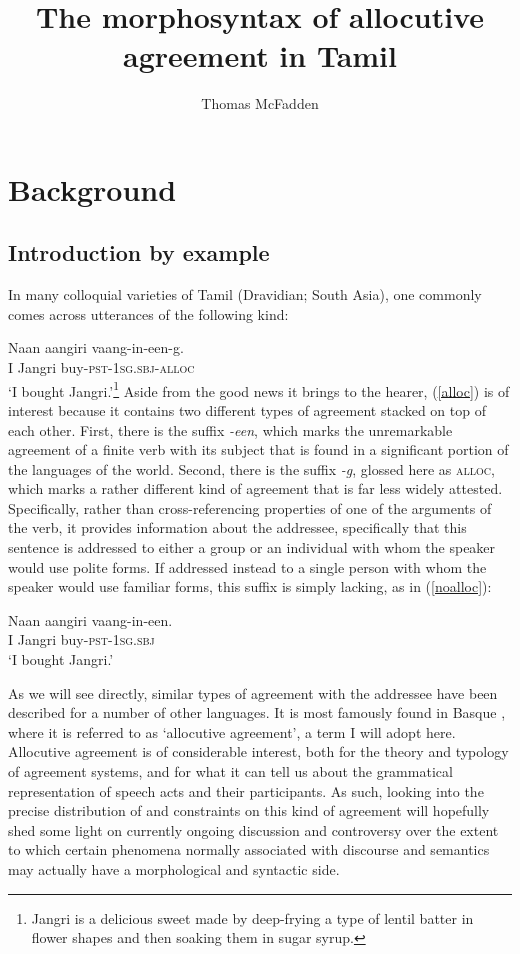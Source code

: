 \documentclass[output=paper, modfonts, nonflat]{langsci/langscibook}
\title{The morphosyntax of allocutive agreement in Tamil}
\author{%
  Thomas McFadden\affiliation{Leibniz-Zentrum Allgemeine Sprachwissenschaft}
}
\begin{document}
\maketitle


\section{Background}

\subsection{Introduction by example}

In many colloquial varieties of Tamil (Dravidian; South Asia), one
commonly comes across utterances of the following kind:

\ea\label{alloc}
\gll Naan \J aangiri vaang-in-een-\ng g\A.\\
I Jangri buy-\textsc{pst}{}-1\textsc{sg.sbj}-\textsc{alloc}\\
\glt `I bought Jangri.'\footnote{Jangri is a delicious sweet made by
  deep-frying a type of lentil batter in flower shapes and then
  soaking them in sugar syrup.} 
\z 
%
Aside from the good news it brings to the hearer, (\ref{alloc}) is of
interest because it contains two different types of agreement stacked
on top of each other. First, there is the suffix \textit{-een}, which
marks the unremarkable agreement of a finite verb with its subject
that is found in a significant portion of the languages of the
world. Second, there is the suffix \textit{-\ng g\A}, glossed here as
\textsc{alloc}, which marks a rather different kind of agreement that
is far less widely attested. Specifically, rather than
cross-referencing properties of one of the arguments of the verb, it
provides information about the addressee, specifically that this
sentence is addressed to either a group or an individual with whom the
speaker would use polite forms. If addressed instead to a single
person with whom the speaker would use familiar forms, this suffix is
simply lacking, as in (\ref{noalloc}):

\ea\label{noalloc}
\gll Naan \J aangiri vaang-in-een.\\
I Jangri buy-\textsc{pst}{}-1\textsc{sg.sbj}\\
\glt `I bought Jangri.'
\z 

\noindent As we will see directly, similar types of agreement with the addressee
have been described for a number of other languages. It is most
famously found in Basque \citep{oyharcabal:1993}, where it is referred
to as `allocutive agreement', a term I will adopt here. Allocutive
agreement is of considerable interest, both for the theory and
typology of agreement systems, and for what it can tell us about the
grammatical representation of speech acts and their participants. As
such, looking into the precise distribution of and constraints on this
kind of agreement will hopefully shed some light on currently ongoing
discussion and controversy over the extent to which certain phenomena
normally associated with discourse and semantics may actually have a
morphological and syntactic side.
\end{document}
